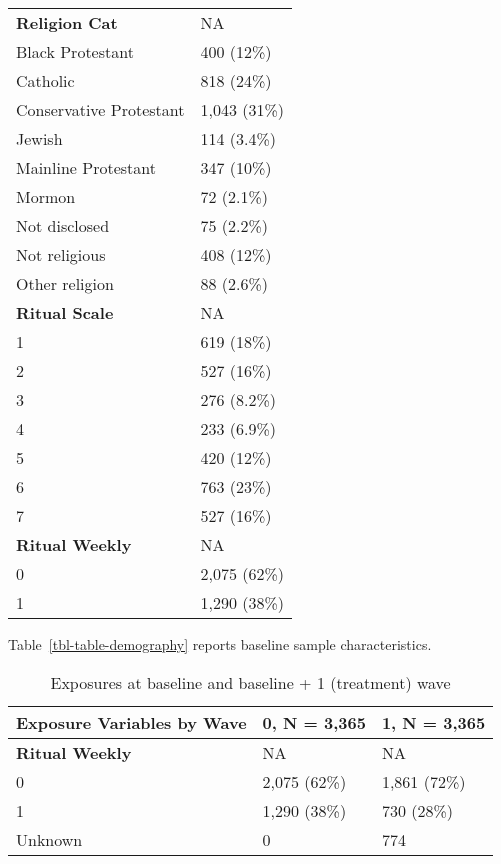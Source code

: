 \documentclass[
  single column]{article}
\begin{document}
\begin{longtable}[]{@{}ll@{}}
\textbf{Religion Cat} & NA \\
Black Protestant & 400 (12\%) \\
Catholic & 818 (24\%) \\
Conservative Protestant & 1,043 (31\%) \\
Jewish & 114 (3.4\%) \\
Mainline Protestant & 347 (10\%) \\
Mormon & 72 (2.1\%) \\
Not disclosed & 75 (2.2\%) \\
Not religious & 408 (12\%) \\
Other religion & 88 (2.6\%) \\
\textbf{Ritual Scale} & NA \\
1 & 619 (18\%) \\
2 & 527 (16\%) \\
3 & 276 (8.2\%) \\
4 & 233 (6.9\%) \\
5 & 420 (12\%) \\
6 & 763 (23\%) \\
7 & 527 (16\%) \\
\textbf{Ritual Weekly} & NA \\
0 & 2,075 (62\%) \\
1 & 1,290 (38\%) \\

\end{longtable}

Table~\ref{tbl-table-demography} reports baseline sample
characteristics.

\newpage{}

\begin{longtable}[]{@{}lll@{}}

\caption{\label{tbl-table-exposures-code}Exposures at baseline and
baseline + 1 (treatment) wave}

\tabularnewline

\toprule\noalign{}
\textbf{Exposure Variables by Wave} & \textbf{0}, N = 3,365 &
\textbf{1}, N = 3,365 \\
\midrule\noalign{}
\endhead
\bottomrule\noalign{}
\endlastfoot
\textbf{Ritual Weekly} & NA & NA \\
0 & 2,075 (62\%) & 1,861 (72\%) \\
1 & 1,290 (38\%) & 730 (28\%) \\
Unknown & 0 & 774 \\

\end{longtable}
\end{document}
